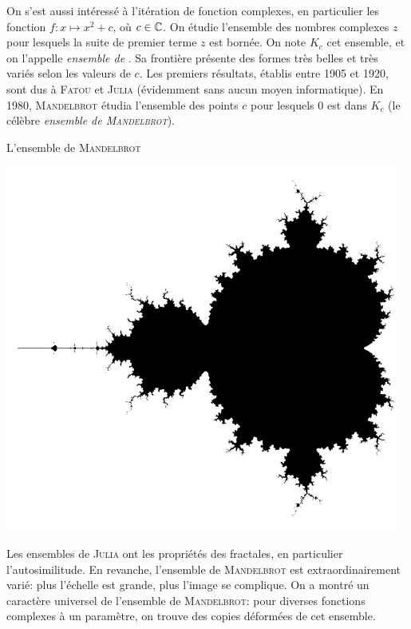 {On s'est aussi intéressé à l'itération de fonction complexes, en particulier les fonction $f : x \mapsto x^2 + c$, où $c \in \mathbb{C}$. On étudie l'ensemble des nombres complexes $z$ pour lesquels la suite de premier terme $z$ est bornée. On note $K_c$ cet ensemble, et on l'appelle \emph{ensemble de }. Sa frontière présente des formes très belles et très variés selon les valeurs de $c$. Les premiers résultats, établis entre 1905 et 1920, sont dus à \textsc{Fatou} et \textsc{Julia} (évidemment sans aucun moyen informatique). En 1980, \textsc{Mandelbrot} étudia l'ensemble des points $c$ pour lesquels $0$ est dans $K_c$ (le célèbre \emph{ensemble de \textsc{Mandelbrot}}). 
\begin{marginfigure}[-2cm]
    \centering
    \caption*{\centering L'ensemble de \textsc{Mandelbrot}}
    \includegraphics[scale=0.5]{images/ensemble_de_mandelbrot.png}
\end{marginfigure}
Les ensembles de \textsc{Julia} ont les propriétés des fractales, en particulier l'autosimilitude. En revanche, l'ensemble de \textsc{Mandelbrot} est extraordinairement varié: plus l'échelle est grande, plus l'image se complique. On a montré un caractère universel de l'ensemble de \textsc{Mandelbrot}: pour diverses fonctions complexes à un paramètre, on trouve des copies déformées de cet ensemble. 
}


